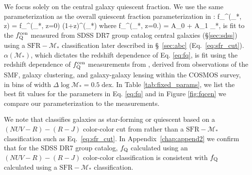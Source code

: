 We focus solely on the central galaxy quiescent fraction. We use the same 
parameterization as the overall quiescent fraction parameterization in \cite{Wetzel:2013aa}: 
\beq \label{eq:fq}
f_^(_*, z) = f_^(_*, z=0) 
\times (1+z)^{\alpha(_*)}
\eeq
where 
\beq \label{eq:fqz0}
f_^(_*, z=0.) = A_0 + A_1\; \log{}_*,
\eeq
is fit to the 
$f_\mathrm{Q}^\mathrm{cen}$ measured from SDSS DR7 group catalog central galaxies (\S \ref{sec:sdss}) 
using a $\mathrm{SFR}-\mathcal{M}_*$ classification later described in 
\S~\ref{sec:abc} (Eq.~\ref{eq:sfr_cut}).
$\alpha(\mathcal{M}_*)$, which dictates
the redshift dependence of Eq. \ref{eq:fq}, is fit using the 
redshift dependence of $f_\mathrm{Q}^\mathrm{cen}$ measurements from \cite{Tinker:2013aa}, 
derived from observations of the SMF, galaxy clustering, and galaxy-galaxy
lensing within the COSMOS survey,
in bins of width $\Delta \log\mathcal{M}_* = 0.5\;\mathrm{dex}$. 
In Table \ref{tab:fixed_params}, we list the best fit values for 
the parameters in Eq. \ref{eq:fq} and in Figure \ref{fig:fqcen} 
we compare our parameterization to the \cite{Tinker:2013aa} 
measurements. 

We note that \cite{Tinker:2013aa} classifies galaxies as star-forming 
or quiescent based on a $(NUV-R) - (R-J)$ color-color cut from 
\cite{Bundy:2010aa} rather than a $\mathrm{SFR}-\mathcal{M}_*$ 
classification such as Eq.~\ref{eq:sfr_cut}. In Appendix~\ref{chap:append2}
we confirm that for the SDSS DR7 group catalog, $f_{\rm Q}$ calculated 
using an $(NUV-R) - (R-J)$ color-color classification is consistent 
with $f_{\rm Q}$ calculated using a $\mathrm{SFR}-\mathcal{M}_*$
classification. 


